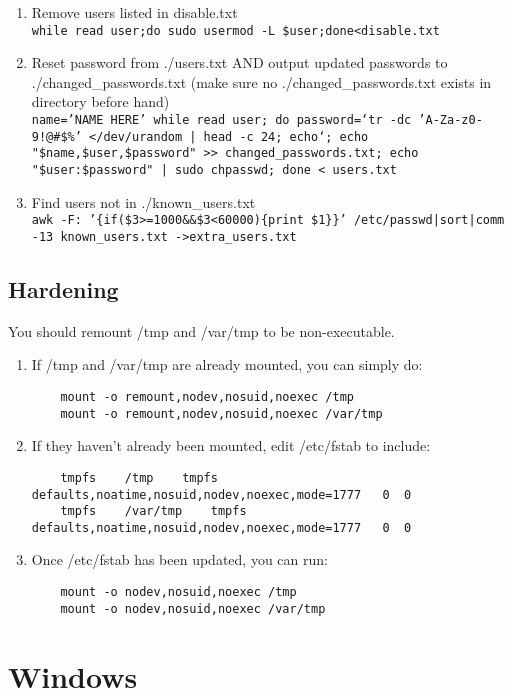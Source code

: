 \documentclass[12pt,letterpaper]{article}
\def\code#1{\textcolor{iris}{\texttt{#1}}}
\begin{document}
\begin{enumerate}
	\item Remove users listed in disable.txt \\
		\code{while read user;do sudo usermod -L \$user;done<disable.txt}
	\item Reset password from ./users.txt AND output updated passwords to ./changed\_passwords.txt (make sure no ./changed\_passwords.txt exists in directory before hand) \\
		\code{name='NAME HERE' while read user; do password=`tr -dc 'A-Za-z0-9!@\#\$\%' </dev/urandom | head -c 24; echo`; echo "\$name,\$user,\$password" >> changed\_passwords.txt; echo "\$user:\$password" | sudo chpasswd; done < users.txt}
	\item Find users not in ./known\_users.txt \\
		\code{awk -F: '\{if(\$3>=1000\&\&\$3<60000)\{print \$1\}\}' /etc/passwd|sort|comm -13 known\_users.txt ->extra\_users.txt}
\end{enumerate}

\subsection{Hardening}

You should remount /tmp and /var/tmp to be non-executable.
\begin{enumerate}
	\item If /tmp and /var/tmp are already mounted, you can simply do:
	\begin{verbatim}
	mount -o remount,nodev,nosuid,noexec /tmp
	mount -o remount,nodev,nosuid,noexec /var/tmp
	\end{verbatim}
	\item If they haven't already been mounted, edit /etc/fstab to include:
	\begin{verbatim}
	tmpfs    /tmp    tmpfs    defaults,noatime,nosuid,nodev,noexec,mode=1777   0  0
	tmpfs    /var/tmp    tmpfs    defaults,noatime,nosuid,nodev,noexec,mode=1777   0  0
	\end{verbatim}
	\item Once /etc/fstab has been updated, you can run:
	\begin{verbatim}
	mount -o nodev,nosuid,noexec /tmp
	mount -o nodev,nosuid,noexec /var/tmp
	\end{verbatim}
\end{enumerate}

\pagebreak

\section{Windows}
\end{document}

